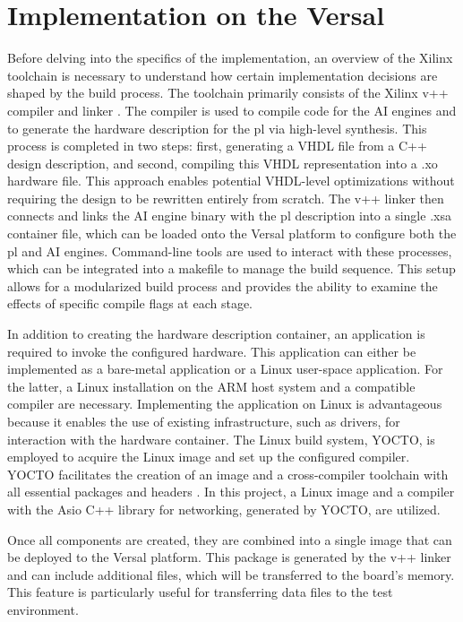 \section{Implementation on the Versal}\label{sec:imp}
Before delving into the specifics of the implementation, an overview of the Xilinx toolchain is necessary to understand how certain implementation decisions are shaped by the build process. The toolchain primarily consists of the Xilinx v++ compiler and linker \cite{churiwala_designing_2017}. The compiler is used to compile code for the AI engines and to generate the hardware description for the \ac{pl} via high-level synthesis. This process is completed in two steps: first, generating a VHDL file from a C++ design description, and second, compiling this VHDL representation into a .xo hardware file. This approach enables potential VHDL-level optimizations without requiring the design to be rewritten entirely from scratch. The v++ linker then connects and links the AI engine binary with the \ac{pl} description into a single .xsa container file, which can be loaded onto the Versal platform to configure both the \ac{pl} and AI engines. Command-line tools are used to interact with these processes, which can be integrated into a makefile to manage the build sequence. This setup allows for a modularized build process and provides the ability to examine the effects of specific compile flags at each stage.\par
In addition to creating the hardware description container, an application is required to invoke the configured hardware. This application can either be implemented as a bare-metal application or a Linux user-space application. For the latter, a Linux installation on the ARM host system and a compatible compiler are necessary. Implementing the application on Linux is advantageous because it enables the use of existing infrastructure, such as drivers, for interaction with the hardware container. The Linux build system, YOCTO, is employed to acquire the Linux image and set up the configured compiler. YOCTO facilitates the creation of an image and a cross-compiler toolchain with all essential packages and headers \cite{streif_embedded_2016}. In this project, a Linux image and a compiler with the Asio C++ library for networking, generated by YOCTO, are utilized.\par
Once all components are created, they are combined into a single image that can be deployed to the Versal platform. This package is generated by the v++ linker and can include additional files, which will be transferred to the board's memory. This feature is particularly useful for transferring data files to the test environment.

